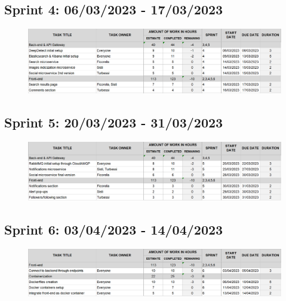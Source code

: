 \documentclass[11pt, a4paper]{article}
\begin{document}
\subsection{Sprint 4: 06/03/2023 - 17/03/2023}
\begin{figure}[H]
    \centering
    \includegraphics[width=1\textwidth]{images/sprint4.png}
\end{figure}
\subsection{Sprint 5: 20/03/2023 - 31/03/2023}
\begin{figure}[H]
    \centering
    \includegraphics[width=1\textwidth]{images/sprint5.png}
\end{figure}
\subsection{Sprint 6: 03/04/2023 - 14/04/2023}
\begin{figure}[H]
    \centering
    \includegraphics[width=1\textwidth]{images/sprint6.png}
\end{figure}

\newpage
\end{document}
